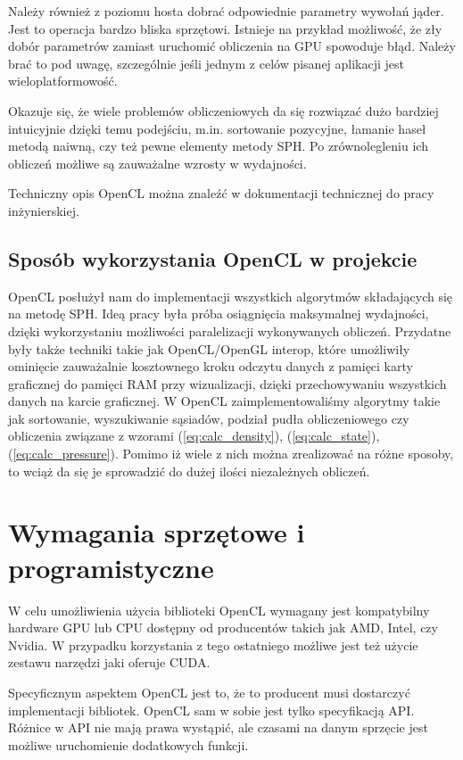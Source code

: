 \documentclass[polish, 12pt]{aghthesis}
\begin{document}
			Należy również z poziomu hosta dobrać odpowiednie parametry wywołań jąder. Jest to operacja bardzo bliska sprzętowi. Istnieje na przykład możliwość, że zły dobór parametrów zamiast uruchomić obliczenia na GPU spowoduje błąd. Należy brać to pod uwagę, szczególnie jeśli jednym z celów pisanej aplikacji jest wieloplatformowość.
			
			Okazuje się, że wiele problemów obliczeniowych da się rozwiązać dużo bardziej intuicyjnie dzięki temu podejściu, m.in. sortowanie pozycyjne, łamanie haseł metodą naiwną, czy też pewne elementy metody SPH. Po zrównolegleniu ich obliczeń możliwe są zauważalne wzrosty w wydajności. 
			
			Techniczny opis OpenCL można znaleźć w dokumentacji technicznej do pracy inżynierskiej.
		
		\subsection{Sposób wykorzystania OpenCL w projekcie}
			OpenCL posłużył nam do implementacji wszystkich algorytmów składających się na metodę SPH. Ideą pracy była próba osiągnięcia maksymalnej wydajności, dzięki wykorzystaniu możliwości paralelizacji wykonywanych obliczeń. Przydatne były także techniki takie jak OpenCL/OpenGL interop, które umożliwiły ominięcie zauważalnie kosztownego kroku odczytu danych z pamięci karty graficznej do pamięci RAM przy wizualizacji, dzięki przechowywaniu wszystkich danych na karcie graficznej. W OpenCL zaimplementowaliśmy algorytmy takie jak sortowanie, wyszukiwanie sąsiadów, podział pudła obliczeniowego czy obliczenia związane z wzorami (\ref{eq:calc_density}), (\ref{eq:calc_state}), (\ref{eq:calc_pressure}). Pomimo iż wiele z nich można zrealizować na różne sposoby, to wciąż da się je sprowadzić do dużej ilości niezależnych obliczeń.
			
	\section{Wymagania sprzętowe i programistyczne}
		W celu umożliwienia użycia biblioteki OpenCL wymagany jest kompatybilny hardware GPU lub CPU dostępny od producentów takich jak AMD, Intel, czy Nvidia. W przypadku korzystania z tego ostatniego możliwe jest też użycie zestawu narzędzi jaki oferuje CUDA.
		
		Specyficznym aspektem OpenCL jest to, że to producent musi dostarczyć implementacji bibliotek. OpenCL sam w sobie jest tylko specyfikacją API. Różnice w API nie mają prawa wystąpić, ale czasami na danym sprzęcie jest możliwe uruchomienie dodatkowych funkcji.
		
\end{document}
